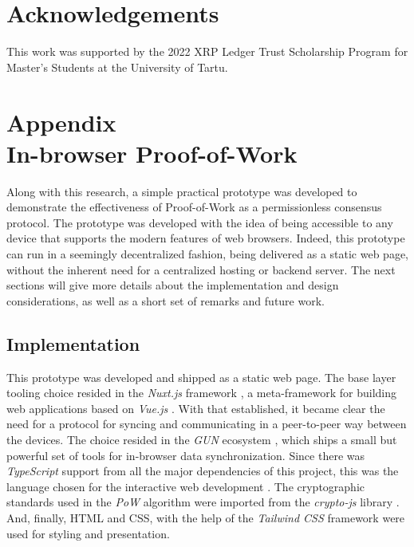 \documentclass[journal]{IEEEtran}
\begin{document}
\section{Acknowledgements}

This work was supported by the 2022 XRP Ledger Trust Scholarship Program for Master's Students
at the University of Tartu.

\ifCLASSOPTIONcaptionsoff
  \newpage
\fi

{}


\newpage 

\section[Appendix. In-browser Proof-of-Work]{Appendix\\ {In-browser Proof-of-Work}}

\bigbreak

Along with this research, a simple practical prototype was developed
to demonstrate the effectiveness of Proof-of-Work as a permissionless consensus protocol.
The prototype was developed with the idea of being accessible to any device that supports
the modern features of web browsers. Indeed, this prototype can run in a seemingly decentralized fashion,
being delivered as a static web page, without the inherent need for a centralized hosting or backend server.
The next sections will give more details about the implementation and design considerations, 
as well as a short set of remarks and future work.

\subsection{Implementation}

This prototype was developed and shipped as a static web page.
The base layer tooling choice resided in the \emph{Nuxt.js} framework \cite{nuxt}, a meta-framework
for building web applications based on \emph{Vue.js} \cite{vuejs}. With that established,
it became clear the need for a protocol for syncing and communicating in a 
peer-to-peer way between the devices. The choice resided in the \emph{GUN} ecosystem \cite{gundb},
which ships a small but powerful set of tools for in-browser data synchronization.
Since there was \emph{TypeScript} support from all the major dependencies of this project,
this was the language chosen for the interactive web development \cite{typescript}. The cryptographic standards used in the 
\emph{PoW} algorithm were imported from the \emph{crypto-js} library \cite{crypto-js}. And, finally, HTML and CSS, with the help
of the \emph{Tailwind CSS} framework \cite{tailwindcss} were used for styling and presentation.
\end{document}
